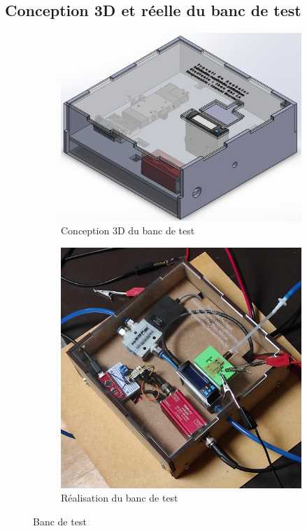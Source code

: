 \subsection{Conception 3D et réelle du banc de test}
\begin{figure}[H]
    \centering
    \begin{subfigure}{0.45\textwidth}
        \includegraphics[scale = 0.4]{assets/figures/Banc_de_test.png}
        \caption{Conception 3D du banc de test}
        \label{fig:3D_banc_test}
    \end{subfigure}
    \hspace{1cm}
    \begin{subfigure}{0.45\textwidth}
        \includegraphics[scale = 0.05, angle = -90]{assets/figures/Banc_de_test_real.png}
        \caption{Réalisation du banc de test}
        \label{fig:banc_test_reel}
    \end{subfigure}
    \caption{Banc de test}
    \label{fig:banc_test}
\end{figure}

